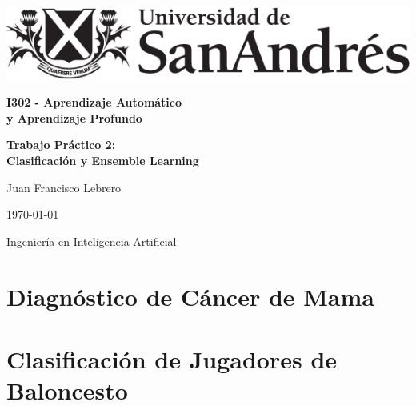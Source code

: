 \documentclass[11pt]{article}
\begin{document}
\begin{titlepage}
    \centering
    \vspace*{0.2cm}
    \includegraphics[scale=0.6]{figures/Logo-Udesa.png}\par
    \vspace{50pt}

    {\LARGE \textbf{I302 - Aprendizaje Automático\\ y Aprendizaje Profundo}\par}
    \vspace{2cm}

    {\LARGE \textbf{Trabajo Práctico 2: \\Clasificación y Ensemble Learning}\par}
    \vspace{4cm}
    
    {\LARGE {Juan Francisco Lebrero}\par}  
    
    \vspace{4cm}
    
    {\Large \today\par}
    \vspace{1cm}
    \Large{Ingeniería en Inteligencia Artificial}
\end{titlepage}

\section*{Diagnóstico de Cáncer de Mama}


\newpage
\section*{Clasificación de Jugadores de Baloncesto}





% 
\end{document}
